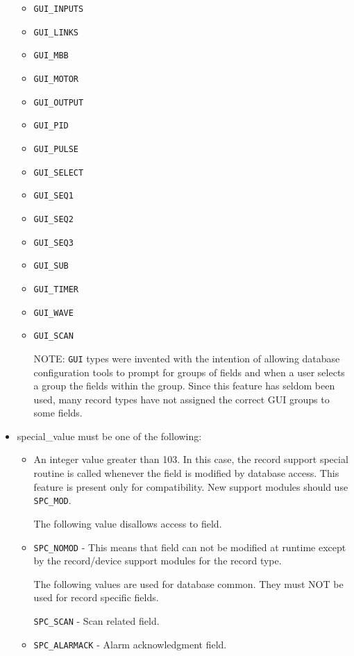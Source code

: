\begin{itemize}
\begin{itemize}
\item \verb|GUI_INPUTS|
\item \verb|GUI_LINKS|
\item \verb|GUI_MBB|
\item \verb|GUI_MOTOR|
\item \verb|GUI_OUTPUT|
\item \verb|GUI_PID|
\item \verb|GUI_PULSE|
\item \verb|GUI_SELECT|
\item \verb|GUI_SEQ1|
\item \verb|GUI_SEQ2|
\item \verb|GUI_SEQ3|
\item \verb|GUI_SUB|
\item \verb|GUI_TIMER|
\item \verb|GUI_WAVE|
\item \verb|GUI_SCAN|

NOTE: \verb|GUI| types were invented with the intention of allowing database configuration tools to prompt for 
groups of fields and when a user selects a group the fields within the group. Since this feature has seldom 
been used, many record types have not assigned the correct GUI groups to some fields.

\end{itemize}\item {}special\_value must be one of the following:

\begin{itemize}
\item An integer value greater than 103. In this case, the record support special routine is called whenever the field 
is modified by database access. This feature is present only for compatibility. New support modules should 
use \verb|SPC_MOD|.

The following value disallows access to field.

\item \verb|SPC_NOMOD| - This means that field can not be modified at runtime except by the record/device support 
modules for the record type.


The following values are used for database common. They must NOT be used for record specific fields.

\verb|SPC_SCAN| - Scan related field.

\item {}\verb|SPC_ALARMACK| - Alarm acknowledgment field.


\end{itemize}
\end{itemize}
